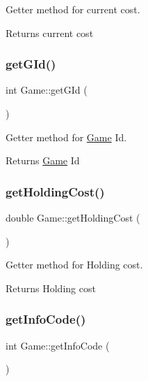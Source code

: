 Getter method for current cost. 

\begin{DoxyReturn}{Returns}
current cost 
\end{DoxyReturn}
\mbox{\label{class_game_aea578dd12fcdf404231a14ecc18fb98a}} 
\subsubsection{\texorpdfstring{get\+G\+Id()}{getGId()}}
{\footnotesize\ttfamily int Game\+::get\+G\+Id (\begin{DoxyParamCaption}{ }\end{DoxyParamCaption})}



Getter method for \hyperlink{class_game}{Game} Id. 

\begin{DoxyReturn}{Returns}
\hyperlink{class_game}{Game} Id 
\end{DoxyReturn}
\mbox{\label{class_game_a7bba0862ffb4fc160a491c982f70a113}} 
\subsubsection{\texorpdfstring{get\+Holding\+Cost()}{getHoldingCost()}}
{\footnotesize\ttfamily double Game\+::get\+Holding\+Cost (\begin{DoxyParamCaption}{ }\end{DoxyParamCaption})}



Getter method for Holding cost. 

\begin{DoxyReturn}{Returns}
Holding cost 
\end{DoxyReturn}
\mbox{\label{class_game_a16cbdc46bd7268319249affa2f24ef3a}} 
\subsubsection{\texorpdfstring{get\+Info\+Code()}{getInfoCode()}}
{\footnotesize\ttfamily int Game\+::get\+Info\+Code (\begin{DoxyParamCaption}{ }\end{DoxyParamCaption})}



